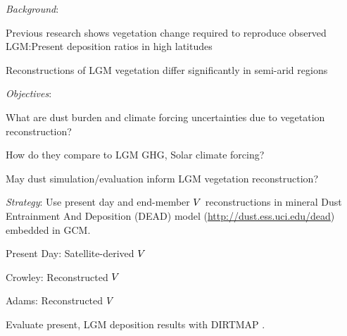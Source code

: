 \documentclass[final,dvips]{foils}
\begin{document}
\rotatefoilhead{\bgl
\Large\textcolor{blue}{\hfill Background \& Objectives \hfill}}\vspace{-0.75in}\large
\textit{Background}: 
\vspace{-0.5in}\begin{itemize*}
\item Previous research shows vegetation change required to reproduce    
observed LGM:Present deposition ratios in high latitudes
\cite[][]{MKH99,WTH02}
\item Reconstructions of LGM vegetation differ significantly 
in semi-arid regions \cite[][]{Cro95,AdF97} 
\end{itemize*}
\textit{Objectives}: 
\vspace{-0.5in}\begin{itemize*}
\item What are dust burden and climate forcing uncertainties due to  
  vegetation reconstruction?
\item How do they compare to LGM GHG, Solar climate forcing?
\item May dust simulation/evaluation inform LGM vegetation reconstruction?
\end{itemize*}

\rotatefoilhead{\bgl
\Large\textcolor{blue}{\hfill Strategy \hfill}}\vspace{-0.5in}\large
\textit{Strategy}:
Use present day and end-member $V$ reconstructions in mineral Dust
Entrainment And Deposition (DEAD) model
(\url{http://dust.ess.uci.edu/dead}) embedded in GCM.\\ 
\begin{itemize*}
\item Present Day: Satellite-derived $V$ \cite[]{KMC99,DZD03}
\item Crowley: Reconstructed $V$ \cite[]{Cro95}
\item Adams: Reconstructed $V$ \cite[]{AdF97}
\end{itemize*}
Evaluate present, LGM deposition results with DIRTMAP \cite[]{KoH01}.
\end{document}
